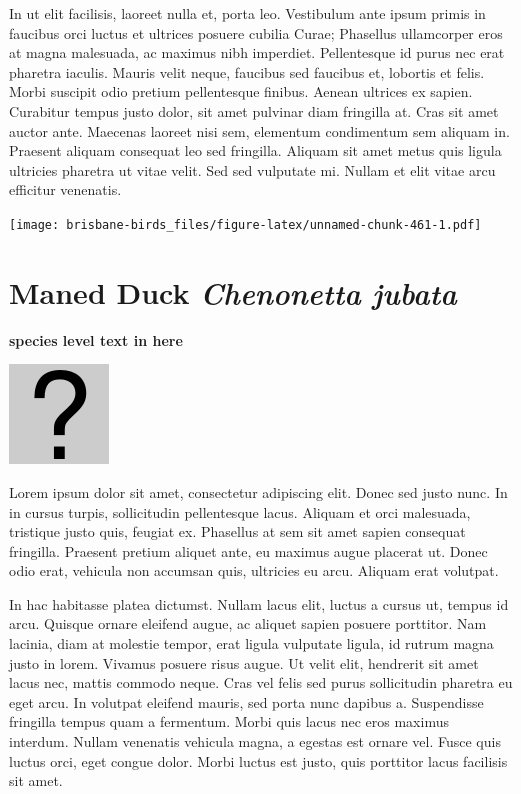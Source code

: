 \documentclass[]{book}
\let\origfigure\figure
\let\endorigfigure\endfigure
\renewenvironment{figure}[1][2] {
  \expandafter\origfigure\expandafter[H]
} {
  \endorigfigure
}
\begin{document}
In ut elit facilisis, laoreet nulla et, porta leo. Vestibulum ante ipsum
primis in faucibus orci luctus et ultrices posuere cubilia Curae;
Phasellus ullamcorper eros at magna malesuada, ac maximus nibh
imperdiet. Pellentesque id purus nec erat pharetra iaculis. Mauris velit
neque, faucibus sed faucibus et, lobortis et felis. Morbi suscipit odio
pretium pellentesque finibus. Aenean ultrices ex sapien. Curabitur
tempus justo dolor, sit amet pulvinar diam fringilla at. Cras sit amet
auctor ante. Maecenas laoreet nisi sem, elementum condimentum sem
aliquam in. Praesent aliquam consequat leo sed fringilla. Aliquam sit
amet metus quis ligula ultricies pharetra ut vitae velit. Sed sed
vulputate mi. Nullam et elit vitae arcu efficitur venenatis.

\begin{figure}
\centering
\texttt{[image: brisbane-birds\_files/figure-latex/unnamed-chunk-461-1.pdf]}
\caption{\label{fig:unnamed-chunk-461}insert figure caption}
\end{figure}

\section{\texorpdfstring{Maned Duck \emph{Chenonetta
jubata}}{Maned Duck Chenonetta jubata}}\label{maned-duck-chenonetta-jubata}

\textbf{species level text in here}

\begin{figure}
\centering
\includegraphics{assets/missing.png}
\caption{No image for species}
\end{figure}

Lorem ipsum dolor sit amet, consectetur adipiscing elit. Donec sed justo
nunc. In in cursus turpis, sollicitudin pellentesque lacus. Aliquam et
orci malesuada, tristique justo quis, feugiat ex. Phasellus at sem sit
amet sapien consequat fringilla. Praesent pretium aliquet ante, eu
maximus augue placerat ut. Donec odio erat, vehicula non accumsan quis,
ultricies eu arcu. Aliquam erat volutpat.

In hac habitasse platea dictumst. Nullam lacus elit, luctus a cursus ut,
tempus id arcu. Quisque ornare eleifend augue, ac aliquet sapien posuere
porttitor. Nam lacinia, diam at molestie tempor, erat ligula vulputate
ligula, id rutrum magna justo in lorem. Vivamus posuere risus augue. Ut
velit elit, hendrerit sit amet lacus nec, mattis commodo neque. Cras vel
felis sed purus sollicitudin pharetra eu eget arcu. In volutpat eleifend
mauris, sed porta nunc dapibus a. Suspendisse fringilla tempus quam a
fermentum. Morbi quis lacus nec eros maximus interdum. Nullam venenatis
vehicula magna, a egestas est ornare vel. Fusce quis luctus orci, eget
congue dolor. Morbi luctus est justo, quis porttitor lacus facilisis sit
amet.
\end{document}
